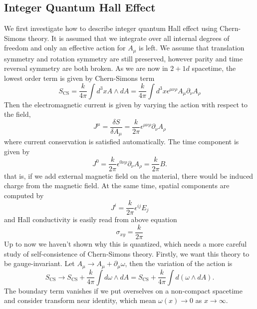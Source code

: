 \documentclass[12pt,a4paper]{article}
\numberwithin{equation}{section}
\begin{document}
\subsection{Integer Quantum Hall Effect}
We first investigate how to describe integer quantum Hall effect using Chern-Simons theory. It is assumed that we integrate over
all internal degrees of freedom and only an effective action for $A_\mu$ is left. We assume that translation symmetry and rotation symmetry
are still preserved, however parity and time reversal symmetry are both broken. As we are now in $2+1 d$ spacetime, the lowest order term is given by Chern-Simons term
\begin{equation}
    S_{\text{CS}} = \frac{k}{4\pi}\int d^3x A\wedge dA = \frac{k}{4\pi}\int d^3x \epsilon^{\mu\nu\rho}A_{\mu}\partial_\nu A_{\rho}
\end{equation}
Then the electromagnetic current is given by varying the action with respect to the field,
\begin{equation}
    J^\mu = \frac{\delta S}{\delta A_\mu} = \frac{k}{2\pi} \epsilon^{\mu\nu\rho}\partial_\nu A_{\rho}
\end{equation}
where current conservation is satisfied automatically. The time component is given by
\begin{equation}
    J^0 = \frac{k}{2\pi} \epsilon^{0\nu\rho}\partial_\nu A_{\rho} = \frac{k}{2\pi}B.
\end{equation}
that is, if we add external magnetic field on the material, there would be induced charge from the magnetic field.
At the same time, spatial components are computed by
\begin{equation}
    J^i = \frac{k}{2\pi} \epsilon^{ij}E_j
\end{equation}
and Hall conductivity is easily read from above equation
\begin{equation}
    \sigma_{xy} = \frac{k}{2\pi}
\end{equation}
Up to now we haven't shown why this is quantized, which needs a more careful study of self-consistence of Chern-Simons theory.
Firstly, we want this theory to be gauge-invariant. Let $A_\mu\to A_\mu + \partial_\mu\omega$, then the variation of the action is 
\begin{equation}
    S_{\text{CS}} \to S_{\text{CS}} + \frac{k}{4\pi} \int d\omega\wedge dA = S_{\text{CS}} + \frac{k}{4\pi} \int d(\omega\wedge dA).
\end{equation}
The boundary term vanishes if we put overselves on a non-compact spacetime and consider transform near identity, which mean $\omega(x)\to 0$ as $x\to\infty$. 
\end{document}
